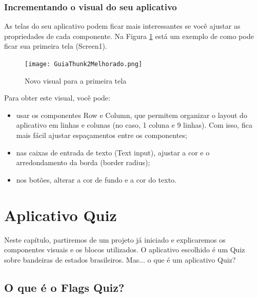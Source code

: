 \documentclass[11pt,fleqn]{book} %
\begin{document}
\subsection{Incrementando o visual do seu aplicativo}

As telas do seu aplicativo podem ficar mais interessantes se você ajustar as propriedades de cada componente. Na Figura \ref{fig:imcmelhor} está um exemplo de como pode ficar sua primeira tela (Screen1).

\begin{figure}[H]
	\centering
	\texttt{[image: GuiaThunk2Melhorado.png]}\hspace{0.2cm}
    \caption{Novo visual para a primeira tela}\label{fig:imcmelhor}
\end{figure} 

Para obter este visual, você pode:

\begin{itemize}
    \item usar os componentes Row e Column, que permitem organizar o layout do aplicativo em linhas e colunas (no caso, 1 coluna e 9 linhas). Com isso, fica mais fácil ajustar espaçamentos entre os componentes;
    \item nas caixas de entrada de texto (Text input), ajustar a cor e o arredondamento da borda (border radius);
    \item nos botões, alterar a cor de fundo e a cor do texto.
\end{itemize}



\chapter{Aplicativo Quiz}\label{ch:appquiz}

Neste capítulo, partiremos de um projeto já iniciado e explicaremos os componentes visuais e os blocos utilizados. O aplicativo escolhido é um Quiz sobre bandeiras de estados brasileiros. Mas... o que é um aplicativo Quiz?

\section{O que é o Flags Quiz?}
\end{document}
